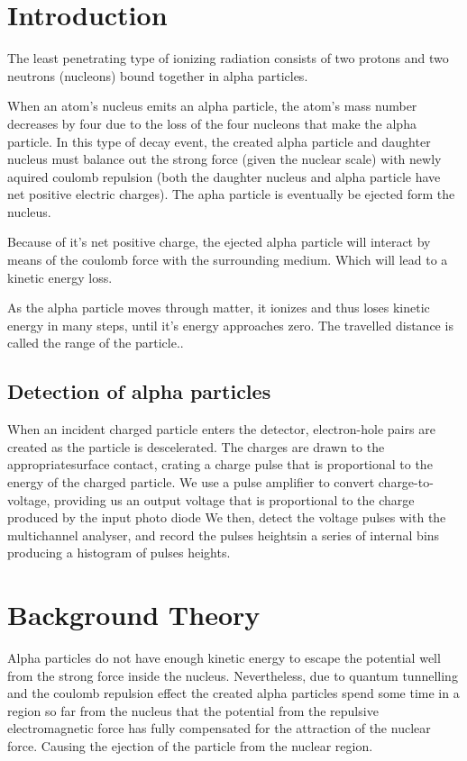 \documentclass[a4paper]{article}
\begin{document}
\section{Introduction}
\begin{multicols}{2}

The least penetrating type of ionizing radiation consists of two protons and two neutrons (nucleons) bound together in alpha particles.\cite{SPA, alpha}

When an atom's nucleus emits an alpha particle, the atom's mass number decreases by four due to the loss of the four nucleons that make the alpha particle\cite{alpha}. 
In this type of decay event, the created alpha particle and daughter nucleus must balance out the strong force (given the nuclear scale) with newly aquired coulomb repulsion (both the daughter nucleus and alpha particle have net positive electric charges). The apha particle is eventually be ejected form the nucleus.

Because of it's net positive charge, the ejected alpha particle will interact by means of the coulomb force with the surrounding medium. Which will lead to a kinetic energy loss.\cite{SPA}

As the alpha particle moves through matter, it ionizes and thus loses kinetic energy in many steps, until it's energy approaches zero. The travelled distance is called the range of the particle.\cite{straggling}.
\subsection{Detection of alpha particles}
When an incident charged particle enters the detector, electron-hole pairs are created as the particle is descelerated. The charges are drawn to the appropriatesurface contact, crating a charge pulse that is proportional to the energy of the charged particle.\cite{SPA}
We use a pulse amplifier to convert charge-to-voltage, providing us an output voltage that is proportional to the charge produced by the input photo diode\cite{SPA}
We then, detect the voltage pulses with the multichannel analyser, and record the pulses heightsin a series of internal bins producing a histogram of pulses heights.\cite{SPA}

\section{Background Theory}
 Alpha particles do not have enough kinetic energy to escape the potential well from the strong force inside the nucleus. Nevertheless, due to quantum tunnelling and the coulomb repulsion effect the created alpha particles spend some time in a region so far from the nucleus that the potential from the repulsive electromagnetic force has fully compensated for the attraction of the nuclear force\cite{alpha}. 
Causing the ejection of the particle from the nuclear region.  
 

\end{multicols}
\end{document}
